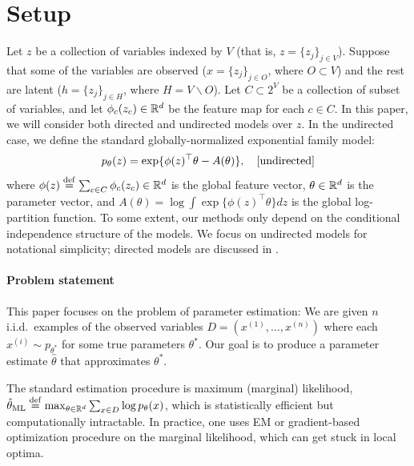 \section{Setup} \label{sec:setup}

Let $z$ be a collection of variables indexed by $V$ (that is, $z = \{z_j\}_{j \in V}$).
Suppose that some of the variables are observed ($x = \{ z_j \}_{j \in O}$, where $O \subset V$) 
and the rest are latent ($h = \{ z_j \}_{j \in H}$, where $H = V \backslash O$).
Let $C \subset 2^V$ be a collection of subset of variables,
and let $\phi_c(z_c) \in \mathbb{R}^d$ be the feature map for each $c \in C$.
In this paper, we will consider both directed and undirected models over $z$.
In the undirected case, we define the standard globally-normalized exponential family model:
\begin{align}
  p_\theta(z) = \exp\{ \phi(z)^\top\theta - A(\theta) \}, \quad\text{[undirected]}
\end{align}
where $\phi(z) \stackrel{\rm def}{=} \sum_{c \in C} \phi_c(z_c) \in \mathbb{R}^d$ is the global feature vector, $\theta \in \mathbb{R}^d$ is the parameter vector,
and $A(\theta) = \log \int \exp\{\phi(z)^\top\theta\} dz$ is the global log-partition function.
To some extent, our methods only depend on the conditional independence
structure of the models.
We focus on undirected models for notational simplicity;
directed models are discussed in .

\paragraph{Problem statement}

This paper focuses on the problem of parameter estimation:
We are given $n$ i.i.d.~examples of the observed variables $D = (x^{(1)}, \dots, x^{(n)})$
where each $x^{(i)} \sim p_{\theta^*}$ for some true parameters $\theta^*$.
Our goal is to produce a parameter estimate $\hat\theta$ that approximates $\theta^*$.

The standard estimation procedure is maximum (marginal) likelihood,
$\hat\theta_\text{\rm ML} \stackrel{\rm def}{=} \max_{\theta \in \mathbb{R}^d} \sum_{x \in D} \log p_\theta(x)$,
which is statistically efficient but computationally intractable.
In practice, one uses EM or gradient-based optimization procedure on the marginal likelihood,
which can get stuck in local optima.
